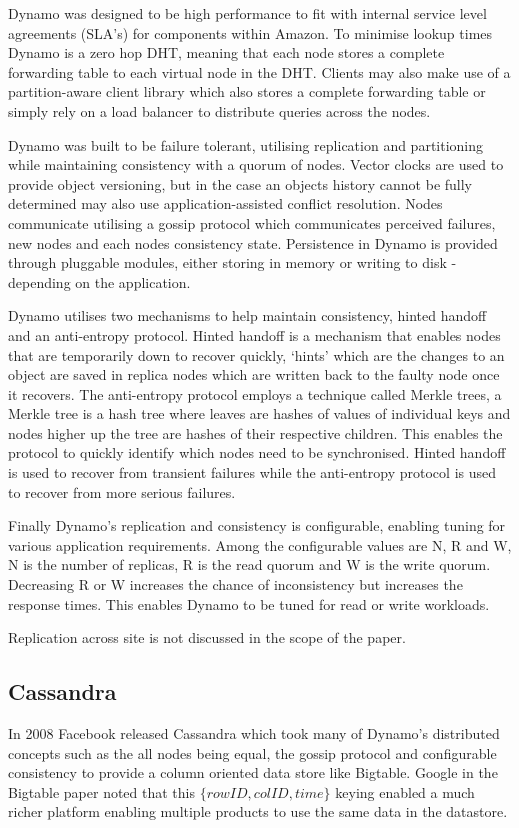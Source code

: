 Dynamo was designed to be high performance to fit with internal service level agreements (SLA's) for components within Amazon. To minimise lookup times Dynamo is a zero hop DHT, meaning that each node stores a complete forwarding table to each virtual node in the DHT. Clients may also make use of a partition-aware client library which also stores a complete forwarding table or simply rely on a load balancer to distribute queries across the nodes.

Dynamo was built to be failure tolerant, utilising replication and partitioning while maintaining consistency with a quorum of nodes. Vector clocks are used to provide object versioning, but in the case an objects history cannot be fully determined may also use application-assisted conflict resolution. Nodes communicate utilising a gossip protocol which communicates perceived failures, new nodes and each nodes consistency state. Persistence in Dynamo is provided through pluggable modules, either storing in memory or writing to disk - depending on the application.

Dynamo utilises two mechanisms to help maintain consistency, hinted handoff and an anti-entropy protocol. Hinted handoff is a mechanism that enables nodes that are temporarily down to recover quickly, `hints' which are the changes to an object are saved in replica nodes which are written back to the faulty node once it recovers. The anti-entropy protocol employs a technique called Merkle trees, a Merkle tree is a hash tree where leaves are hashes of values of individual keys and nodes higher up the tree are hashes of their respective children. This enables the protocol to quickly identify which nodes need to be synchronised. Hinted handoff is used to recover from transient failures while the anti-entropy protocol is used to recover from more serious failures.

Finally Dynamo’s replication and consistency is configurable, enabling tuning for various application requirements. Among the configurable values are  N, R and W, N is the number of replicas, R is the read quorum and W is the write quorum. Decreasing R or W increases the chance of inconsistency but increases the response times. This enables Dynamo to be tuned for read or write workloads.

Replication across site is not discussed in the scope of the paper.

\subsection{Cassandra}
In 2008 Facebook released Cassandra\cite{cassandra} which took many of Dynamo's distributed concepts such as the all nodes being equal, the gossip protocol and configurable consistency to provide a column oriented data store like Bigtable. Google in the Bigtable paper noted that this $\{rowID, colID, time\}$ keying enabled a much richer platform enabling multiple products to use the same data in the datastore. 

